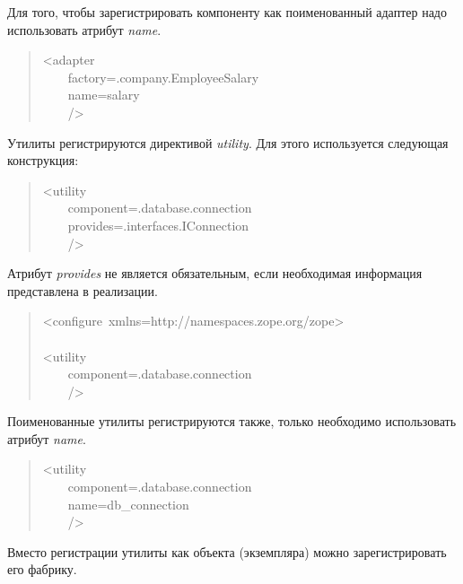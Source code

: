 \documentclass[a4paper,openany,twoside,final]{book}
\providecommand*{\DUroletitlereference}[1]{\textsl{#1}}
\begin{document}
Для того, чтобы зарегистрировать компоненту как поименованный адаптер
надо использовать атрибут \DUroletitlereference{name}.

\begin{quote}{\ttfamily \raggedright \noindent
<adapter\\
~~~~factory=\textquotedbl{}.company.EmployeeSalary\textquotedbl{}\\
~~~~name=\textquotedbl{}salary\textquotedbl{}\\
~~~~/>
}
\end{quote}

Утилиты регистрируются директивой \DUroletitlereference{utility}.  Для этого используется
следующая конструкция:

\begin{quote}{\ttfamily \raggedright \noindent
<utility\\
~~~~component=\textquotedbl{}.database.connection\textquotedbl{}\\
~~~~provides=\textquotedbl{}.interfaces.IConnection\textquotedbl{}\\
~~~~/>
}
\end{quote}

Атрибут \DUroletitlereference{provides} не является обязательным, если необходимая
информация представлена в реализации.

\begin{quote}{\ttfamily \raggedright \noindent
<configure~xmlns=\textquotedbl{}http://namespaces.zope.org/zope\textquotedbl{}>\\
~\\
<utility\\
~~~~component=\textquotedbl{}.database.connection\textquotedbl{}\\
~~~~/>
}
\end{quote}

Поименованные утилиты регистрируются также, только необходимо
использовать атрибут \DUroletitlereference{name}.

\begin{quote}{\ttfamily \raggedright \noindent
<utility\\
~~~~component=\textquotedbl{}.database.connection\textquotedbl{}\\
~~~~name=\textquotedbl{}db\_connection\textquotedbl{}\\
~~~~/>
}
\end{quote}

Вместо регистрации утилиты как объекта (экземпляра) можно
зарегистрировать его фабрику.
\end{document}
